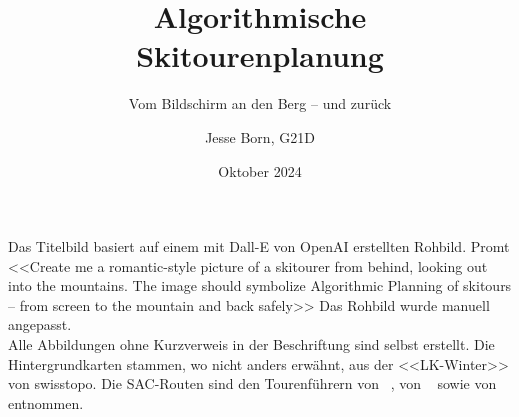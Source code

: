 \documentclass[a4paper, listof=numbered, numbers=noenddot]{scrarticle}
\title{\AKAfont\Huge\textcolor{AKSAcolor}{Algorithmische\\Skitourenplanung}}
\subtitle{Vom Bildschirm an den Berg -- und zurück}
\author{Jesse Born, G21D}
\date{Oktober 2024}
\begin{document}

\maketitle
\tableofcontents

% 






\clearpage


\printbibliography[heading=bibnumbered]
\clearpage

\appendix
{}
\glsaddallunused
\printglossary[type=\acronymtype, style=long, title={Abkürzungsverzeichnis}, nonumberlist]
\clearpage
\listoffigures

Das Titelbild basiert auf einem mit Dall-E von OpenAI erstellten Rohbild. Promt <<Create me a romantic-style picture of a skitourer from behind, looking out into the mountains. The image should symbolize Algorithmic Planning of skitours -- from screen to the mountain and back safely>> Das Rohbild wurde manuell angepasst.\\

Alle Abbildungen ohne Kurzverweis in der Beschriftung sind selbst erstellt. Die Hintergrundkarten stammen, wo nicht anders erwähnt, aus der <<LK-Winter>> von swisstopo. Die SAC-Routen sind den Tourenführern  von \citeauthor{mmzentralch}~\cite{mmzentralch},  von \citeauthor{classiquesrandoski}~\cite{classiquesrandoski} sowie  von \citeauthor{twslstgallappzll}~\cite{twslstgallappzll} entnommen.
\clearpage

\end{document}
